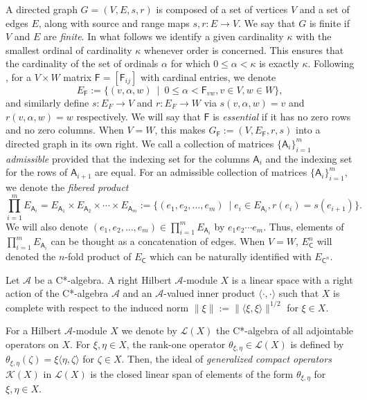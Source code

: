 \documentclass[11pt, letterpaper,final]{amsart}
\newcommand{\A}{{\mathcal{A}}}
\newcommand{\K}{{\mathcal{K}}}
\renewcommand{\L}{{\mathcal{L}}}
\theoremstyle{definition}
\begin{document}
A directed graph $G=(V,E,s,r)$ is composed of a set of vertices $V$ and a set of edges $E$, along with source and range maps $s,r: E \rightarrow V$. We say that $G$ is finite if $V$ and $E$ are \emph{finite}. In what follows we identify a given cardinality $\kappa$ with the smallest ordinal of cardinality $\kappa$ whenever order is concerned. This ensures that the cardinality of the set of ordinals $\alpha$ for which $0 \leq \alpha < \kappa$ is exactly $\kappa$. Following \cite{CDE}, for a $V \times W$ matrix $\mathsf{F} = [\mathsf{F}_{ij}]$ with cardinal entries, we denote
$$
E_\mathsf{F} := \{ (v, \alpha, w) \ \mid \  0 \leq \alpha < \mathsf{F}_{vw}, v \in V, w \in W\},
$$ 
and similarly define $s: E_F \rightarrow V$ and $r: E_F \rightarrow W$ via $s(v, \alpha, w) = v$ and $r(v, \alpha, w) = w$ respectively. We will say that $\mathsf{F}$ is \emph{essential} if it has no zero rows and no zero columns. When $V = W$, this makes $G_\mathsf{F} := (V, E_\mathsf{F}, r, s )$ into a directed graph in its own right.  We call a collection of matrices $\{\mathsf{ A}_i \}_{i=1}^m$ \emph{admissible} provided that the indexing set for the columns $\mathsf{A}_i$ and the indexing set for the rows of $\mathsf{A}_{i+1}$ are equal.  For an admissible collection of matrices $\{ \mathsf{A}_i \}_{i=1}^m$, we denote the \emph{fibered product}
$$
\prod_{i=1}^m E_{\mathsf{A}_i} =E_{\mathsf{A}_1} \times  E_{\mathsf{A}_2} \times \cdots \times E_{\mathsf{A}_m}:= \{ (e_1,e_2, \dots , e_m) \ \mid e_i \in E_{\mathsf{A}_i}, r(e_i)=s(e_{i+1}) \}.
$$
We will also denote $(e_1,e_2, \dots , e_m) \in\prod_{i=1}^m E_{\mathsf{A}_i}$ by $e_1 e_2 \cdots e_m$.  Thus, elements of $\prod_{i=1}^m E_{\mathsf{A}_i}$ can be thought as a concatenation of edges.  When $V= W$, $E_\mathsf{C}^n$ will denoted the $n$-fold product of $E_\mathsf{C}$ which can be naturally identified with $E_{\mathsf{C}^n}$.


Let $\A$ be a C*-algebra. A right Hilbert $\A$-module $X$ is a linear space with a right action of the C*-algebra $\A$ and an $\A$-valued inner product $\langle \cdot, \cdot \rangle$ such that $X$ is complete with respect to the induced norm $\| \xi \|:= \| \langle \xi,\xi \rangle \|^{1/2}$ for $\xi \in X$.


For a Hilbert $\A$-module $X$ we denote by $\L(X)$ the C*-algebra of all adjointable operators on $X$. For $\xi,\eta \in X$, the rank-one operator $\theta_{\xi,\eta} \in \L(X)$ is defined by $\theta_{\xi,\eta}(\zeta) = \xi \langle \eta,\zeta \rangle$ for $\zeta \in X$. Then, the ideal of \emph{generalized compact operators} $\K(X)$ in $\L(X)$ is the closed linear span of elements of the form $\theta_{\xi,\eta}$ for $\xi,\eta \in X$.
\end{document}

